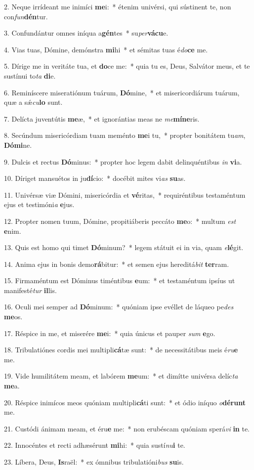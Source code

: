 2. Neque irrídeant me inimíci \textbf{me}i:~*  étenim univérsi, qui sústinent te, non con\textit{fun}\textbf{dén}tur.\

3. Confundántur omnes iníqua a\textbf{gén}tes~*  su\textit{per}\textbf{vá}\textbf{cu}e.\

4. Vias tuas, Dómine, demónstra \textbf{mi}hi~*  et sémitas tuas é\textit{do}\textbf{ce} me.\

5. Dírige me in veritáte tua, et \textbf{do}ce me:~*  quia tu es, Deus, Salvátor meus, et te sustínui to\textit{ta} \textbf{di}e.\

6. Reminíscere miseratiónum tuárum, \textbf{Dó}mine,~*  et misericordiárum tuárum, quæ a sǽ\textit{cu}\textbf{lo} sunt.\

7. Delícta juventútis \textbf{me}æ,~*  et ignorántias meas ne \textit{me}\textbf{mí}\textbf{ne}ris.\

8. Secúndum misericórdiam tuam meménto \textbf{me}i tu,~*  propter bonitátem tu\textit{am}, \textbf{Dó}\textbf{mi}ne.\

9. Dulcis et rectus \textbf{Dó}minus:~*  propter hoc legem dabit delinquéntibus \textit{in} \textbf{vi}a.\

10. Díriget mansuétos in ju\textbf{dí}cio:~*  docébit mites vi\textit{as} \textbf{su}as.\

11. Univérsæ viæ Dómini, misericórdia et \textbf{vé}ritas,~*  requiréntibus testaméntum ejus et testimóni\textit{a} \textbf{e}jus.\

12. Propter nomen tuum, Dómine, propitiáberis peccáto \textbf{me}o:~*  multum \textit{est} \textbf{e}nim.\

13. Quis est homo qui timet \textbf{Dó}minum?~*  legem státuit ei in via, quam \textit{e}\textbf{lé}git.\

14. Anima ejus in bonis demo\textbf{rá}bitur:~*  et semen ejus hereditá\textit{bit} \textbf{ter}ram.\

15. Firmaméntum est Dóminus timéntibus \textbf{e}um:~*  et testaméntum ipsíus ut manifesté\textit{tur} \textbf{il}lis.\

16. Oculi mei semper ad \textbf{Dó}minum:~*  quóniam ipse evéllet de láqueo pe\textit{des} \textbf{me}os.\

17. Réspice in me, et miserére \textbf{me}i:~*  quia únicus et pauper \textit{sum} \textbf{e}go.\

18. Tribulatiónes cordis mei multipli\textbf{cá}tæ sunt:~*  de necessitátibus meis é\textit{ru}\textbf{e} me.\

19. Vide humilitátem meam, et labórem \textbf{me}um:~*  et dimítte univérsa delíc\textit{ta} \textbf{me}a.\

20. Réspice inimícos meos quóniam multipli\textbf{cá}ti sunt:~*  et ódio iníquo \textit{o}\textbf{dé}\textbf{runt} me.\

21. Custódi ánimam meam, et éru\textbf{e} me:~*  non erubéscam quóniam sperá\textit{vi} \textbf{in} te.\

22. Innocéntes et recti adhæsérunt \textbf{mi}hi:~*  quia sustí\textit{nu}\textbf{i} te.\

23. Líbera, Deus, \textbf{Is}raël:~*  ex ómnibus tribulatióni\textit{bus} \textbf{su}is.\

